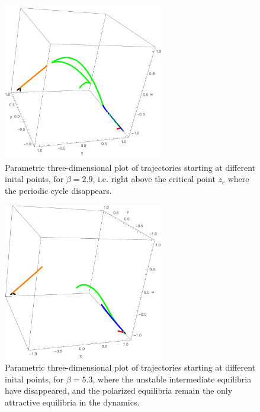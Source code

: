 \documentclass[a4paper,10pt,leqno]{amsart}
\theoremstyle{plain}
\begin{document}
\begin{figure}   
\centering   
\includegraphics[width=7cm]{3D_sim_b=2_9.pdf}   
\caption{Parametric three-dimensional plot of trajectories starting at different inital points, for $\beta = 2.9$, i.e. right above the critical point $z_c$ where the periodic cycle disappears.}   
\label{3D_pic4}   
\end{figure}   

\begin{figure}   
\centering   
\includegraphics[width=7cm]{3D_sim_b=5_3.pdf}   
\caption{Parametric three-dimensional plot of trajectories starting at different inital points, for $\beta = 5.3$, where the unstable intermediate equilibria have disappeared, and the polarized equilibria remain the only attractive equilibria in the dynamics.}   
\label{3D_pic5}   
\end{figure}   
\end{document}
